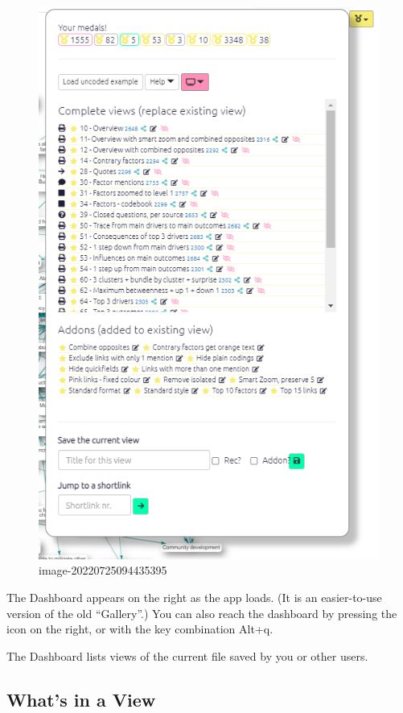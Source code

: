 \documentclass[
]{book}
\begin{document}
\begin{figure}
\centering
\includegraphics{_assets/image-20220725094435395.png}
\caption{image-20220725094435395}
\end{figure}

The Dashboard appears on the right as the app loads. (It is an easier-to-use version of the old ``Gallery''.) You can also reach the dashboard by pressing the 🏅 icon on the right, or with the key combination Alt+q.

The Dashboard lists views of the current file saved by you or other users.

\hypertarget{whats-in-a-view}{%
\subsection{What's in a View}\label{whats-in-a-view}}
\end{document}
